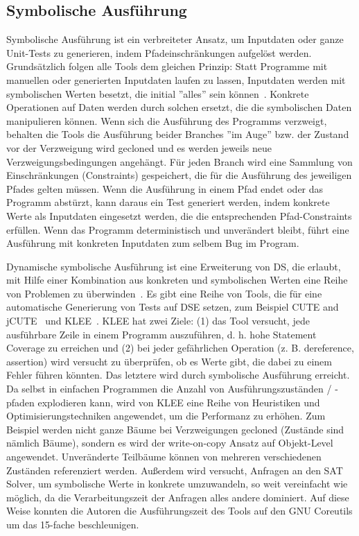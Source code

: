 \documentclass{article}
\begin{document}
\subsection{Symbolische Ausführung}
Symbolische Ausführung ist ein verbreiteter Ansatz, um Inputdaten oder ganze Unit-Tests zu generieren, indem Pfadeinschränkungen aufgelöst werden.  Grundsätzlich folgen alle Tools dem gleichen Prinzip: Statt Programme mit manuellen oder generierten Inputdaten laufen zu lassen, Inputdaten werden mit symbolischen Werten besetzt, die initial ''alles'' sein können~\cite{cadar2008klee}. Konkrete Operationen auf Daten werden durch solchen ersetzt, die die symbolischen Daten manipulieren können. Wenn sich die Ausführung des Programms verzweigt, behalten die Tools die Ausführung beider Branches ''im Auge'' bzw. der Zustand vor der Verzweigung wird gecloned und es werden jeweils neue Verzweigungsbedingungen angehängt. Für jeden Branch wird eine Sammlung von Einschränkungen (Constraints) gespeichert, die für die Ausführung des jeweiligen Pfades gelten müssen. Wenn die Ausführung in einem Pfad endet oder das Programm abstürzt, kann daraus ein Test generiert werden, indem konkrete Werte als Inputdaten eingesetzt werden, die die entsprechenden Pfad-Constraints erfüllen. Wenn das Programm deterministisch und unverändert bleibt, führt eine Ausführung mit konkreten Inputdaten zum selbem Bug im Program. 

Dynamische symbolische Ausführung ist eine Erweiterung von DS, die erlaubt, mit Hilfe einer Kombination aus konkreten und symbolischen Werten eine Reihe von Problemen zu überwinden~\cite{Fraser_2013}. Es gibt eine Reihe von Tools, die für eine automatische Generierung von Tests auf DSE setzen, zum Beispiel CUTE and jCUTE~\cite{10.1007/11817963_38} und KLEE~\cite{cadar2008klee}. 
KLEE hat zwei Ziele: (1) das Tool versucht, jede ausführbare Zeile in einem Programm auszuführen, d. h. hohe Statement Coverage zu erreichen und (2) bei jeder gefährlichen Operation (z. B. dereference, assertion) wird versucht zu überprüfen, ob es Werte gibt, die dabei zu einem Fehler führen könnten. Das letztere wird durch symbolische Ausführung erreicht. Da selbst in einfachen Programmen die Anzahl von Ausführungszuständen / -pfaden explodieren kann, wird von KLEE eine Reihe von Heuristiken und Optimisierungstechniken angewendet, um die Performanz zu erhöhen. Zum Beispiel werden nicht ganze Bäume bei Verzweigungen gecloned (Zustände sind nämlich Bäume), sondern es wird der write-on-copy Ansatz auf Objekt-Level angewendet. Unveränderte Teilbäume können von mehreren verschiedenen Zuständen referenziert werden. Außerdem wird versucht, Anfragen an den SAT Solver, um symbolische Werte in konkrete umzuwandeln, so weit vereinfacht wie möglich, da die Verarbeitungszeit der Anfragen alles andere dominiert. Auf diese Weise konnten die Autoren die Ausführungszeit des Tools auf den GNU Coreutils um das 15-fache beschleunigen.
\end{document}
